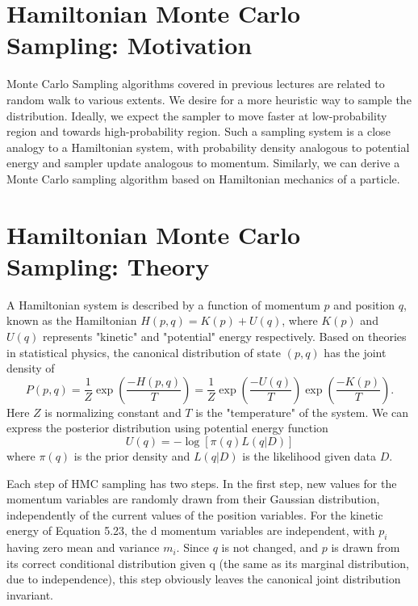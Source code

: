 \documentclass[twoside]{article}
\begin{document}
\section{Hamiltonian Monte Carlo Sampling: Motivation}
Monte Carlo Sampling algorithms covered in previous lectures are related to random walk to various extents. We desire for a more heuristic way to sample the distribution. Ideally, we expect the sampler to move faster at low-probability region and towards high-probability region. Such a sampling system is a close analogy to a Hamiltonian system, with probability density analogous to potential energy and sampler update analogous to momentum. Similarly, we can derive a Monte Carlo sampling algorithm based on Hamiltonian mechanics of a particle.

\section{Hamiltonian Monte Carlo Sampling: Theory}
A Hamiltonian system is described by a function of momentum $p$ and position $q$, known as the Hamiltonian $H(p,q)=K(p)+U(q)$, where $K(p)$ and $U(q)$ represents "kinetic" and "potential" energy respectively. Based on theories in statistical physics, the canonical distribution of state $(p,q)$ has the joint density of 
\begin{equation}
P(p,q)=\frac{1}{Z}\exp\left(\frac{-H(p,q)}{T}\right)=\frac{1}{Z}\exp\left(\frac{-U(q)}{T}\right)\exp\left(\frac{-K(p)}{T}\right).
\end{equation}
Here $Z$ is normalizing constant and $T$ is the "temperature" of the system. We can express the posterior distribution using potential energy function
\begin{equation}
U(q)=-\log\left[\pi(q)L(q|D)\right]
\end{equation}
where $\pi(q)$ is the prior density and $L(q|D)$ is the likelihood given data $D$.

Each step of HMC sampling has two steps. In the first step, new values for the momentum variables are randomly drawn from their Gaussian distribution, independently of the current values of the position variables. For the kinetic energy of Equation 5.23, the d momentum variables are independent, with $p_i$ having zero mean and variance $m_i$. Since $q$ is not changed, and $p$ is drawn from its correct conditional distribution given q (the same as its marginal distribution, due to independence), this step obviously leaves the canonical joint distribution invariant.
\end{document}
